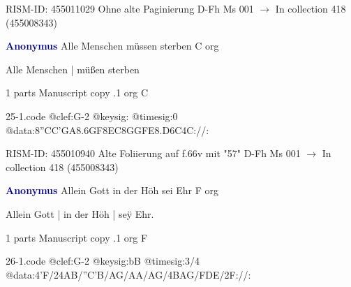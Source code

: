 \documentclass[twocolumn]{book}
\begin{document}
\newline RISM-ID: 455011029
\newline Ohne alte Paginierung
\newline D-Fh  Ms 001
\newline $\rightarrow$ In collection 418 (455008343)

\newline \par \vspace{7pt} \textcolor{darkblue}{\textbf{Anonymus  }}
\newline Alle Menschen müssen sterben  C  
\newline org
\newline \begin{itshape}[f.66v, at left:] Alle Menschen | müßen sterben\end{itshape} 
\newline \textcolor{darkblue}{}  1 parts  
\newline Manuscript copy
.1  org  C  
\begin{filecontents*}{25-1.code}
@clef:G-2
@keysig:
@timesig:0
@data:{8''CC'GA}{8.6GF8EC}{8GGFE}{8.D6C}4C://:
\end{filecontents*}
\newline
%

\newline RISM-ID: 455010940
\newline Alte Foliierung auf f.66v mit "57"
\newline D-Fh  Ms 001
\newline $\rightarrow$ In collection 418 (455008343)

\newline \par \vspace{7pt} \textcolor{darkblue}{\textbf{Anonymus  }}
\newline Allein Gott in der Höh sei Ehr  F  
\newline org
\newline \begin{itshape}[f.26v, at left:] Allein Gott | in der Höh | seÿ Ehr.\end{itshape} 
\newline \textcolor{darkblue}{}  1 parts  
\newline Manuscript copy
.1  org  F  
\begin{filecontents*}{26-1.code}
@clef:G-2
@keysig:bB
@timesig:3/4
@data:4'F/24AB/''C'B/AG/AA/AG/4BAG/FDE/2F://:
\end{filecontents*}
\newline
%
\end{document}
